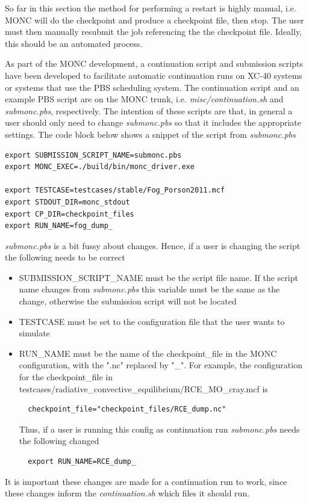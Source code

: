 \documentclass[a4paper,11pt]{article}
\begin{document}
So far in this section the method for performing a restart is highly manual, i.e.
MONC will do the checkpoint and produce a checkpoint file, then stop. The user must
then manually resubmit the job referencing the the checkpoint file. Ideally,
this should be an automated process.

As part of the MONC development, a continuation script and submission scripts
have been developed to facilitate automatic continuation runs on XC-40 systems
or systems that use the PBS scheduling system. The continuation script and an
example PBS script are on the MONC trunk, i.e. \emph{misc/continuation.sh} and
\emph{submonc.pbs}, respectively. The intention of these scripts are that, in
general a user should only need to change \emph{submonc.pbs} so that it includes
the appropriate settings. The code block below shows a snippet of the script
from \emph{submonc.pbs}
\begin{lstlisting}
export SUBMISSION_SCRIPT_NAME=submonc.pbs
export MONC_EXEC=./build/bin/monc_driver.exe

export TESTCASE=testcases/stable/Fog_Porson2011.mcf
export STDOUT_DIR=monc_stdout
export CP_DIR=checkpoint_files
export RUN_NAME=fog_dump_
\end{lstlisting}
\emph{submonc.pbs} is a bit fussy about changes. Hence,
if a user is changing the script the following needs to be correct
\begin{itemize}
  \item {SUBMISSION\_SCRIPT\_NAME must be the script file name. If the script name
   changes from \emph{submonc.pbs} this variable must be the same as the change,
   otherwise the submission script will not be located}
  \item {TESTCASE must be set to the configuration file that the user wants to
  simulate}
  \item {RUN\_NAME must be the name of the checkpoint\_file in the MONC
  configuration, with the ".nc" replaced by "\_". For example, the
  configuration for the checkpoint\_file in
  testcases/radiative\_convective\_equilibrium/RCE\_MO\_cray.mcf is
  \begin{lstlisting}
  checkpoint_file="checkpoint_files/RCE_dump.nc"
  \end{lstlisting}
  Thus, if a user is running this config as continuation run \emph{submonc.pbs}
  needs the following changed
  \begin{lstlisting}
  export RUN_NAME=RCE_dump_
  \end{lstlisting}
  }
\end{itemize}
It is important these changes are made for a continuation run to work, since
these changes inform the \emph{continuation.sh} which files it should run.
\end{document}
